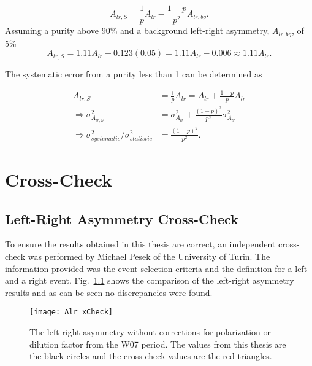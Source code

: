 \begin{equation}
  A_{lr,S} = \frac{1}{p} A_{lr} - \frac{1-p}{p^2} A_{lr,bg}.
\end{equation}
\noindent
Assuming a purity above 90\% and a background left-right asymmetry, $A_{lr,bg}$,
of 5\%
\begin{equation}
  A_{lr,S} = 1.11 A_{lr} - 0.123(0.05) = 1.11 A_{lr} - 0.006\approx 1.11 A_{lr}.
\end{equation}

The systematic error from a purity less than 1 can be determined as

\begin{align}
  A_{lr,S} &= \frac{1}{p}A_{lr} = A_{lr} + \frac{1-p}{p}A_{lr}
  \\ \nonumber
  \Rightarrow \sigma^2_{A_{lr,S}} &= \sigma^2_{A_{lr}} + \frac{(1-p)^2}{p^2} \sigma^2_{A_{lr}}
  \\ \nonumber
  \Rightarrow \sigma^2_{systematic}/\sigma^2_{statistic} &= \frac{(1-p)^2}{p^2}.
\end{align}


\chapter{Cross-Check}
\section{Left-Right Asymmetry Cross-Check} \label{app::xcheckAlr}

To ensure the results obtained in this thesis are correct, an independent
cross-check was performed by Michael Pesek of the University of Turin.  The
information provided was the event selection criteria and the definition for a
left and a right event.  Fig.~\ref{fig::Alr_xCheck} shows the comparison of the
left-right asymmetry results and as can be seen no discrepancies were found.

\begin{figure}[h!t]
  \centering
  \texttt{[image: Alr\_xCheck]}
  \caption{The left-right asymmetry without corrections for polarization or
    dilution factor from the W07 period.  The values from this thesis are the
    black circles and the cross-check values are the red triangles.}
  \label{fig::Alr_xCheck}
\end{figure}

